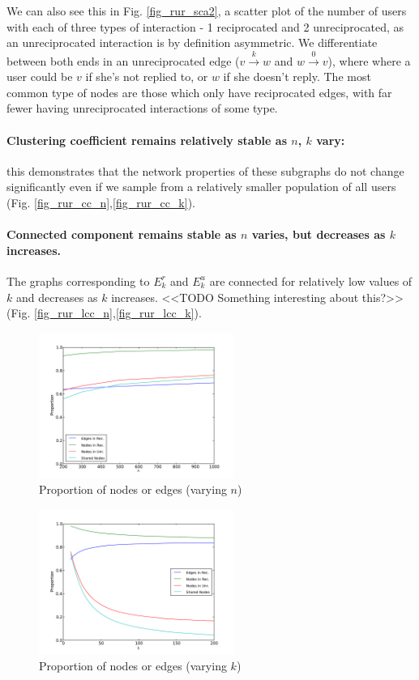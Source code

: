 \documentclass[conference]{IEEEtran}
\begin{document}
We can also see this in Fig. \ref{fig_rur_sca2}, a scatter plot of the number of users with each of three types of interaction - 1 reciprocated and 2 unreciprocated, as an unreciprocated  interaction is by definition asymmetric. 
We differentiate between both ends in an unreciprocated edge ($v \xrightarrow{k} w$ and $w \xrightarrow{0} v$), where where a user could be $v$ if she's not replied to, or $w$ if she doesn't reply. 
The most common type of nodes are those which only have reciprocated edges, with far fewer having unreciprocated interactions of some type.

\paragraph{Clustering coefficient remains relatively stable as $n$, $k$ vary:} this demonstrates that the network properties of these subgraphs do not change significantly even if we sample from a relatively smaller population of all users (Fig. \ref{fig_rur_cc_n},\ref{fig_rur_cc_k}).

\paragraph{Connected component remains stable as $n$ varies, but decreases as $k$ increases.} 
The graphs corresponding to $E_k^r$ and $E_k^u$ are connected for relatively low values of $k$ and decreases as $k$ increases. <<TODO Something interesting about this?>> (Fig. \ref{fig_rur_lcc_n},\ref{fig_rur_lcc_k}).

\begin{figure}[!t]
\centering
\includegraphics[width=2.5in]{proportion_edgesnodes_n}                
\caption{Proportion of nodes or edges (varying $n$)}
\label{fig_rur_propn}
\end{figure}

\begin{figure}[!t]
\centering
\includegraphics[width=2.5in]{proportion_edgesnodes_k}                
\caption{Proportion of nodes or edges (varying $k$)}
\label{fig_rur_propk}
\end{figure}
\end{document}
